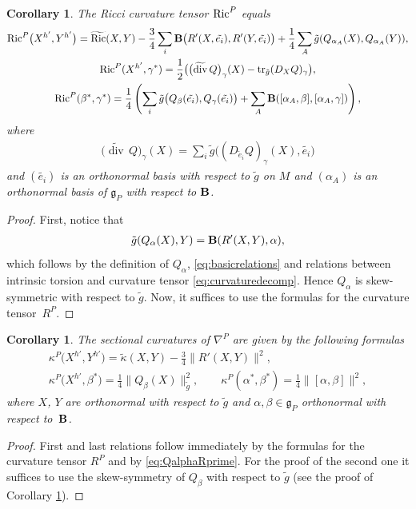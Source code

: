 \documentclass[10pt,a4paper]{amsart}
\numberwithin{equation}{section}
\newtheorem{Corollary}[Theorem]{Corollary}
\begin{document}
\begin{Corollary}\label{cor:RicciP}
The Ricci curvature tensor ${\rm Ric}^P$ equals
\begin{gather*}
{\rm Ric}^P\big(X^{h'},Y^{h'}\big) =\widetilde{{\rm Ric}}(X,Y)-\frac{3}{4}\sum_i{\bf B}\big(R'(X,\tilde{e_i}),R'(Y,\tilde{e_i})\big)
+\frac{1}{4}\sum_A \tilde{g}(Q_{\alpha_A}(X),Q_{\alpha_A}(Y)),\\
{\rm Ric}^P(X^{h'},\gamma^{\ast}) =\frac{1}{2}\big( \big(\widetilde{\operatorname{div}}\, Q\big)_{\gamma}(X)-\operatorname{tr}_{\tilde{g}}(D_XQ)_{\gamma} \big),\\
{\rm Ric}^P(\beta^{\ast},\gamma^{\ast}) =\frac{1}{4}\left( \sum_i \tilde{g}\big(Q_{\beta}(\tilde{e_i}),Q_{\gamma}(\tilde{e_i})\big)+\sum_A {\bf B}([\alpha_A,\beta],[\alpha_A,\gamma]) \right),
\end{gather*}
where
\begin{gather*}
\big(\widetilde{\operatorname{div}}\,  Q\big)_{\gamma}(X)=\sum_i\tilde{g}\big((D_{\tilde e_i}Q)_{\gamma}(X),\tilde{e_i}\big)
\end{gather*}
and $(\tilde{e_i})$ is an orthonormal basis with respect to $\tilde{g}$ on $M$ and $(\alpha_A)$ is an orthonormal basis of $\mathfrak{g}_P$ with respect to ${\bf B}$.
\end{Corollary}
\begin{proof}
First, notice that
\begin{gather}\label{eq:QalphaRprime}
\tilde{g}(Q_{\alpha}(X),Y)={\bf B}(R'(X,Y),\alpha),
\end{gather}
which follows by the def\/inition of $Q_{\alpha}$, \eqref{eq:basicrelations} and relations between intrinsic torsion and curvature tensor \eqref{eq:curvaturedecomp}. Hence $Q_{\alpha}$ is skew-symmetric with respect to $\tilde{g}$. Now, it suf\/f\/ices to use the formulas for the curvature tensor~$R^P$.
\end{proof}

\begin{Corollary}\label{cor:SectionalP}
The sectional curvatures of $\nabla^P$ are given by the following formulas
\begin{gather*}
\kappa^P\big(X^{h'},Y^{h'}\big) =\tilde{\kappa}(X,Y)-\frac{3}{4}\|R'(X,Y)\|^2,\\
\kappa^P\big(X^{h'},\beta^{\ast}\big) =\frac{1}{4}\|Q_{\beta}(X)\|^2_{\tilde{g}},\qquad
\kappa^P(\alpha^{\ast},\beta^{\ast}) =\frac{1}{4}\|[\alpha,\beta]\|^2,
\end{gather*}
where $X$, $Y$ are orthonormal with respect to $\tilde{g}$ and $\alpha,\beta\in\mathfrak{g}_P$ orthonormal with respect to~${\bf B}$.
\end{Corollary}
\begin{proof}
First and last relations follow immediately by the formulas for the curvature tensor $R^P$ and by \eqref{eq:QalphaRprime}. For the proof of the second one it suf\/f\/ices to use the skew-symmetry of $Q_{\beta}$ with respect to $\tilde{g}$ (see the proof of Corollary \ref{cor:RicciP}).
\end{proof}
\end{document}
